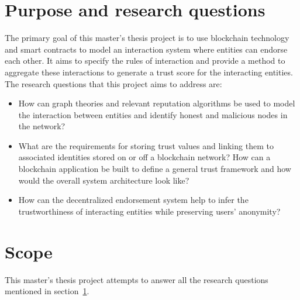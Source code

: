 \section{Purpose and research questions} \label{ResearchQuestions}
The primary goal of this master's thesis project is to use blockchain
technology and smart contracts to model an interaction system where entities
can endorse each other. It aims to specify the rules of interaction and provide
a method to aggregate these interactions to generate a trust score for the
interacting entities. The research questions that this project aims to address
are: 
\begin{itemize}
		\item How can graph theories and relevant reputation algorithms be used
			to model the interaction between entities and identify honest and
			malicious nodes in the network? \label{question1}
		\item What are the requirements for storing trust values and linking
			them to associated identities stored on or off a blockchain
			network? How can a blockchain application be built to define a
			general trust framework and how would the overall system
			architecture look like?\label{question2} 
		\item How can the decentralized endorsement system help to infer the
			trustworthiness of interacting entities while preserving users'
			anonymity?  \label{question3} 
\end{itemize}
\section{Scope} 
This master's thesis project attempts to answer all the research questions
mentioned in section~\ref{ResearchQuestions}.  

